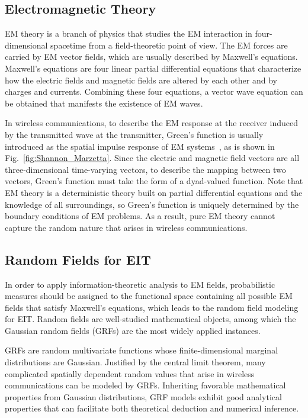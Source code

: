 \documentclass[journal,twocolumn]{IEEEtran}
\begin{document}
\subsection{Electromagnetic Theory}
\label{Sec_2_Subsec_3}
EM theory is a branch of physics that studies the EM interaction in four-dimensional spacetime from a field-theoretic point of view. The EM forces are carried by EM vector fields, which are usually described by Maxwell's equations. Maxwell's equations are four linear partial differential equations that characterize how the electric fields and magnetic fields are altered by each other and by charges and currents. Combining these four equations, a vector wave equation can be obtained that manifests the existence of EM waves. 

In wireless communications, to describe the EM response at the receiver induced by the transmitted wave at the transmitter, Green's function is usually introduced as the spatial impulse response of EM systems~\cite{stratton2007electromagnetic}, as is shown in Fig.~\ref{fig:Shannon_Marzetta}. Since the electric and magnetic field vectors are all three-dimensional time-varying vectors, to describe the mapping between two vectors, Green's function must take the form of a dyad-valued function. 
Note that EM theory is a deterministic theory built on partial differential equations and the knowledge of all surroundings, so Green's function is uniquely determined by the boundary conditions of EM problems.
As a result, pure EM theory cannot capture the random nature that arises in wireless communications. 

\subsection{Random Fields for EIT}
\label{Sec_2_Subsec_4}
In order to apply information-theoretic analysis to EM fields, probabilistic measures should be assigned to the functional space containing all possible EM fields that satisfy Maxwell's equations, which leads to the random field modeling for EIT. 
Random fields are well-studied mathematical objects, among which the Gaussian random fields (GRFs) are the most widely applied instances. 

GRFs are random multivariate functions whose finite-dimensional marginal distributions are Gaussian. Justified by the central limit theorem, many complicated spatially dependent random values that arise in wireless communications can be modeled by GRFs.  
Inheriting favorable mathematical properties from Gaussian distributions, GRF models exhibit good analytical properties that can facilitate both theoretical deduction and numerical inference. 
\end{document}
